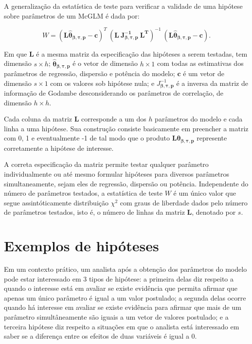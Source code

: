 A generalização da estatística de teste para verificar a validade de uma hipótese sobre parâmetros de um McGLM é dada por:

\begin{equation}
W = (\boldsymbol{L\hat\theta_{\beta,\tau,p}} - \boldsymbol{c})^T \ (\boldsymbol{L \ J_{\boldsymbol{{\beta,\tau,p}}}^{-1} \ L^T})^{-1} \ (\boldsymbol{L\hat\theta_{\beta,\tau,p}} - \boldsymbol{c}).
\end{equation}

\noindent Em que $\boldsymbol{L}$ é a mesma matriz da especificação das hipóteses a serem testadas, tem dimensão $s \times h$; $\boldsymbol{\hat\theta_{\beta,\tau,p}}$ é o vetor de dimensão $h \times 1$ com todas as estimativas dos parâmetros de regressão, dispersão e potência do modelo; $\boldsymbol{c}$ é um vetor de dimensão $s \times 1$ com os valores sob hipótese nula; e $J_{\boldsymbol{{\beta,\tau,p}}}^{-1}$ é a inversa da matriz de informação de Godambe desconsiderando os parâmetros de correlação, de dimensão $h \times h$.

Cada coluna da matriz $\boldsymbol{L}$ corresponde a um dos $h$ parâmetros do modelo e cada linha a uma hipótese. Sua construção consiste basicamente em preencher a matriz com 0, 1 e eventualmente -1 de tal modo que o produto $\boldsymbol{L}\boldsymbol{\theta_{\beta,\tau,p}}$ represente corretamente a hipótese de interesse.

A correta especificação da matriz permite testar qualquer parâmetro individualmente ou até mesmo formular hipóteses para diversos parâmetros simultaneamente, sejam eles de regressão, dispersão ou potência. Independente do número de parâmetros testados, a estatística de teste $W$ é um único valor que segue assintóticamente distribuição $\chi^2$ com graus de liberdade dados pelo número de parâmetros testados, isto é, o número de linhas da matriz $\boldsymbol{L}$, denotado por $s$.

\section{Exemplos de hipóteses}

Em um contexto prático, um analista após a obtenção dos parâmetros do modelo pode estar interessado em 3 tipos de hipótese: a primeira delas diz respeito a quando o interesse está em avaliar se existe evidência que permita afirmar que apenas um único parâmetro é igual a um valor postulado; a segunda delas ocorre quando há interesse em avaliar se existe evidência para afirmar que mais de um parâmetro simultâneamente são iguais a um vetor de valores postulado; e a terceira hipótese diz respeito a situações em que o analista está interessado em saber se a diferença entre os efeitos de duas variáveis é igual a 0.

